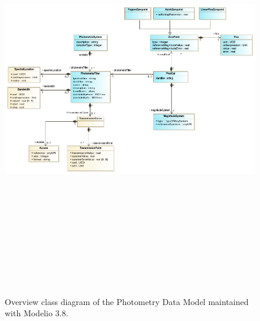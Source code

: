 \documentclass[11pt,a4paper]{ivoa}
\begin{document}
\begin{figure}[H]
\includegraphics[angle=90,width=5.98in,height=7.19in]{./schema/PhotometryOverviewDiagram_20220520.png} 
\caption{Overview class diagram of the Photometry Data Model maintained with Modelio 3.8.}
\end{figure}
\end{document}

